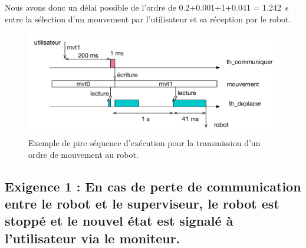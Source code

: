 \documentclass[11pt, a4paper]{paper}
\begin{document}
{Nous avons donc un délai possible de l'ordre de 0.2+0.001+1+0.041 = 1.242~s entre la sélection d'un mouvement par l'utilisateur et sa réception par le robot.

\begin{figure}[htbp]
\begin{center}
\includegraphics[scale=0.6]{./figures-pdf/sequence}
\caption{\color{red}Exemple de pire séquence d'exécution pour la transmission d'un ordre de mouvement au robot.}
\label{fig:seq}
\end{center}
\end{figure}
}

\subsection{Exigence 1 : En cas de perte de communication entre le robot et le superviseur, le robot est stoppé et le nouvel état est signalé à l'utilisateur via le moniteur.}
\end{document}
